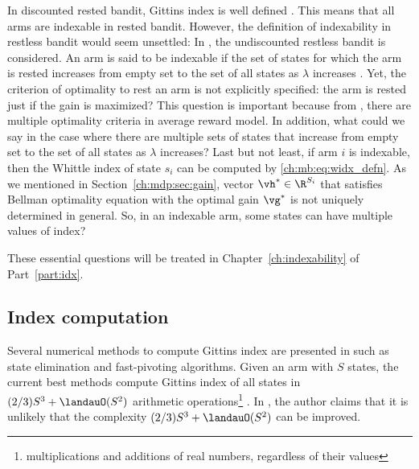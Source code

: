 In discounted rested bandit, Gittins index is well defined \cite{chakravorty2014multi}.
This means that all arms are indexable in rested bandit.
However, the definition of indexability in restless bandit would seem unsettled:
In \cite[Chapter~14]{whittle1996optimal}, the undiscounted restless bandit is considered.
An arm is said to be indexable if the set of states for which the arm is rested increases from empty set to the set of all states as $\lambda$ increases \cite[Page~280]{whittle1996optimal}.
Yet, the criterion of optimality to rest an arm is not explicitly specified: the arm is rested just if the gain is maximized?
This question is important because from \cite{puterman2014markov}, there are multiple optimality criteria in average reward model.
In addition, what could we say in the case where there are multiple sets of states that increase from empty set to the set of all states as $\lambda$ increases?
Last but not least, if arm $i$ is indexable, then the Whittle index of state $s_i$ can be computed by \eqref{ch:mb:eq:widx_defn}.
As we mentioned in Section~\ref{ch:mdp:sec:gain}, vector $\vh^*\in\R^{S_i}$ that satisfies Bellman optimality equation with the optimal gain $\vg^*$ is not uniquely determined in general.
So, in an indexable arm, some states can have multiple values of index?

These essential questions will be treated in Chapter~\ref{ch:indexability} of Part~\ref{part:idx}.

\subsection{Index computation}

Several numerical methods to compute Gittins index are presented in \cite{chakravorty2014multi} such as state elimination \cite{sonin2008generalized} and fast-pivoting \cite{nino20072} algorithms.
Given an arm with $S$ states, the current best methods compute Gittins index of all states in $(2/3)S^3+\landauO(S^2)$ arithmetic operations\footnote{multiplications and additions of real numbers, regardless of their values} \cite{chakravorty2014multi}.
In \cite[Page~4]{nino2020fast}, the author claims that it is unlikely that the complexity $(2/3)S^3+\landauO(S^2)$ can be improved.


